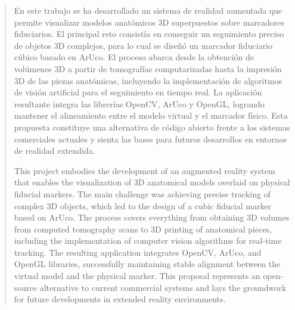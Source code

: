 
\pagestyle{empty}
\begin{abstract}
  En este trabajo se ha desarrollado un sistema de realidad aumentada que permite visualizar modelos anatómicos 3D superpuestos sobre marcadores fiduciarios. El principal reto consistía en conseguir un seguimiento preciso de objetos 3D complejos, para lo cual se diseñó un marcador fiduciario cúbico basado en ArUco. El proceso abarca desde la obtención de volúmenes 3D a partir de tomografías computarizadas hasta la impresión 3D de las piezas anatómicas, incluyendo la implementación de algoritmos de visión artificial para el seguimiento en tiempo real. La aplicación resultante integra las librerías OpenCV, ArUco y OpenGL, logrando mantener el alineamiento entre el modelo virtual y el marcador físico. Esta propuesta constituye una alternativa de código abierto frente a los sistemas comerciales actuales y sienta las bases para futuros desarrollos en entornos de realidad extendida.


  \vspace*{25pt}
  \begin{segundoresumo}
    This project embodies the development of an augmented reality system that enables the visualization of 3D anatomical models overlaid on physical fiducial markers. The main challenge was achieving precise tracking of complex 3D objects, which led to the design of a cubic fiducial marker based on ArUco. The process covers everything from obtaining 3D volumes from computed tomography scans to 3D printing of anatomical pieces, including the implementation of computer vision algorithms for real-time tracking. The resulting application integrates OpenCV, ArUco, and OpenGL libraries, successfully maintaining stable alignment between the virtual model and the physical marker. This proposal represents an open-source alternative to current commercial systems and lays the groundwork for future developments in extended reality environments.
  \end{segundoresumo}
\vspace*{25pt}

\end{abstract}
\pagestyle{fancy}

